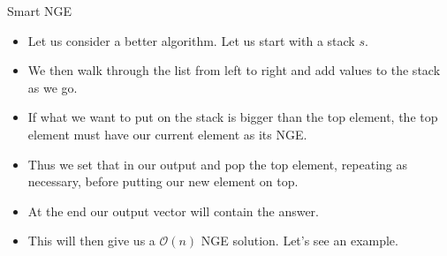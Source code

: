 \documentclass{beamer}
\begin{document}
\begin{frame}[plain]{Smart NGE}
    \begin{itemize}
        \item Let us consider a better algorithm. Let us start with a stack $s$.
        \item We then walk through the list from left to right and add values to the stack as we go.
        \item If what we want to put on the stack is bigger than the top element, the top element must have our current element as its NGE.
        \item Thus we set that in our output and pop the top element, repeating as necessary, before putting our new element on top.
        \item At the end our output vector will contain the answer.
        \item This will then give us a $\mathcal{O}(n)$ NGE solution. Let's see an example.
    \end{itemize}
\end{frame}






\end{document}
